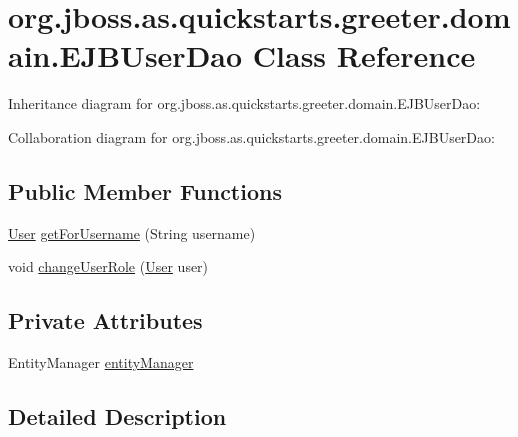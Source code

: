\hypertarget{classorg_1_1jboss_1_1as_1_1quickstarts_1_1greeter_1_1domain_1_1_e_j_b_user_dao}{}\section{org.\+jboss.\+as.\+quickstarts.\+greeter.\+domain.\+E\+J\+B\+User\+Dao Class Reference}
\label{classorg_1_1jboss_1_1as_1_1quickstarts_1_1greeter_1_1domain_1_1_e_j_b_user_dao}


Inheritance diagram for org.\+jboss.\+as.\+quickstarts.\+greeter.\+domain.\+E\+J\+B\+User\+Dao\+:


Collaboration diagram for org.\+jboss.\+as.\+quickstarts.\+greeter.\+domain.\+E\+J\+B\+User\+Dao\+:
\subsection*{Public Member Functions}
\begin{DoxyCompactItemize}
\item 
\hyperlink{classorg_1_1jboss_1_1as_1_1quickstarts_1_1greeter_1_1domain_1_1_user}{User} \hyperlink{classorg_1_1jboss_1_1as_1_1quickstarts_1_1greeter_1_1domain_1_1_e_j_b_user_dao_ac008840023639fd560a40f5bef61da6b}{get\+For\+Username} (String username)
\item 
void \hyperlink{classorg_1_1jboss_1_1as_1_1quickstarts_1_1greeter_1_1domain_1_1_e_j_b_user_dao_a42c366e895e01ef3e8afa36b750c3068}{change\+User\+Role} (\hyperlink{classorg_1_1jboss_1_1as_1_1quickstarts_1_1greeter_1_1domain_1_1_user}{User} user)
\end{DoxyCompactItemize}
\subsection*{Private Attributes}
\begin{DoxyCompactItemize}
\item 
Entity\+Manager \hyperlink{classorg_1_1jboss_1_1as_1_1quickstarts_1_1greeter_1_1domain_1_1_e_j_b_user_dao_a1735274f4e3efed8b472d1974a66ba34}{entity\+Manager}
\end{DoxyCompactItemize}


\subsection{Detailed Description}


